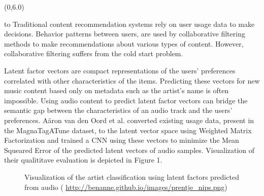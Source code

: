 \documentclass[a0]{a0poster}
\def\Head#1{
  \noindent\hbox to \hsize{\hfil{\LARGE\color{DarkBlue}\sf #1}}\bigskip}
\begin{document}
  \begin{textblock}{7}(0,6.0)
    \Head{The Problem}
    \sf 
    Traditional content recommendation systems rely on user usage data to make
    decisions. Behavior patterns between users, are used by collaborative
    filtering methods to make recommendations about various types of content.
    However, collaborative filtering suffers from the cold start problem.

    Latent factor vectors are compact representations of the users'
    preferences correlated with other characteristics of the items. Predicting
    these vectors for new music content based only on metadata such as the
    artist's name is often impossible. Using audio content to predict latent
    factor vectors can bridge the semantic gap between the characteristics of
    an audio track and the users' preferences. A\"{a}ron van den Oord et al.
    converted existing usage data, present in the MagnaTagATune dataset, to the
    latent vector space using Weighted Matrix Factorization and trained a CNN
    using these vectors to minimize the Mean Squeared Error of the predicted
    latent vectors of audio samples. Visualization of their qualititave 
    evaluation is depicted in Figure 1.
    
    \hspace*{1cm}
    \begin{center}
      \begin{figure}
      \centering
      \caption{Visualization of the artist classification using latent factors
        predicted from audio (
        \url{http://benanne.github.io/images/prentje\_nips.png})}
      \end{figure}
    \end{center}
    \hspace*{1cm}

  \end{textblock}
\end{document}
